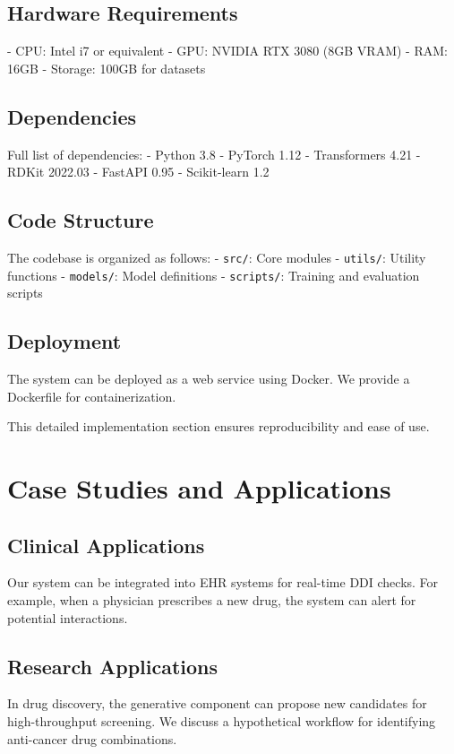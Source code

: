\documentclass[12pt,a4paper]{article}
\begin{document}
\subsection{Hardware Requirements}
- CPU: Intel i7 or equivalent
- GPU: NVIDIA RTX 3080 (8GB VRAM)
- RAM: 16GB
- Storage: 100GB for datasets

\subsection{Dependencies}
Full list of dependencies:
- Python 3.8
- PyTorch 1.12
- Transformers 4.21
- RDKit 2022.03
- FastAPI 0.95
- Scikit-learn 1.2

\subsection{Code Structure}
The codebase is organized as follows:
- \texttt{src/}: Core modules
- \texttt{utils/}: Utility functions
- \texttt{models/}: Model definitions
- \texttt{scripts/}: Training and evaluation scripts

\subsection{Deployment}
The system can be deployed as a web service using Docker. We provide a Dockerfile for containerization.

This detailed implementation section ensures reproducibility and ease of use.

\section{Case Studies and Applications}
\label{sec:case_studies}

\subsection{Clinical Applications}
Our system can be integrated into EHR systems for real-time DDI checks. For example, when a physician prescribes a new drug, the system can alert for potential interactions.

\subsection{Research Applications}
In drug discovery, the generative component can propose new candidates for high-throughput screening. We discuss a hypothetical workflow for identifying anti-cancer drug combinations.
\end{document}
